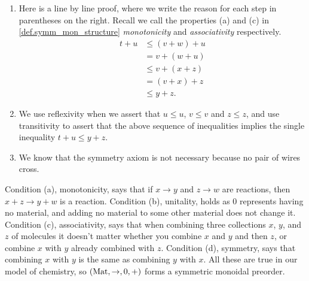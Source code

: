 \documentclass[7Sketches]{subfiles}
\begin{document}
{
\begin{enumerate}
\item Here is a line by line proof, where we write the reason for each step in
parentheses on the right. Recall we call the properties
(a) and (c) in \cref{def.symm_mon_structure} \emph{monotonicity} and
\emph{associativity} respectively.
\begin{align*}
	t+u & \leq (v+w)+u \tag{monotonicity, $t \leq
	v+w$, $u \leq u$} \\
	& = v+(w+u) \tag{associativity} \\
	& \leq v+(x+z) \tag{monotonicity, $v \leq v$,
	$w+u \leq x+v$} \\
	& = (v+x)+z \tag{associativitiy} \\
	& \leq y+z. \tag{monotonicity, $v+x\leq y$, $z
	\leq z$}
\end{align*}
\item We use reflexivity when we assert that $u \leq u$, $v \leq v$ and $z \leq
z$, and use transitivity to assert that the above sequence of inequalities
implies the single inequality $t+u \leq y+z$.
\item We know that the symmetry axiom is not necessary because no pair of wires
cross.
\end{enumerate}
}

{
Condition (a), monotonicity, says that if $x \rightarrow y$ and $z \rightarrow
w$ are reactions, then $x+z \rightarrow y+w$ is a reaction. Condition (b),
unitality, holds as $0$ represents having no material, and adding no material
to some other material does not change it. Condition (c),
associativity, says that when combining three collections $x$, $y$, and $z$ of
molecules it doesn't matter whether you combine $x$ and $y$ and then $z$, or
combine $x$ with $y$ already combined with $z$. Condition (d), symmetry, says
that combining $x$ with $y$ is the same as combining $y$ with $x$. All these
are true in our model of chemistry, so $(\mathrm{Mat},\rightarrow,0,+)$ forms a symmetric monoidal
preorder.
}
\end{document}
